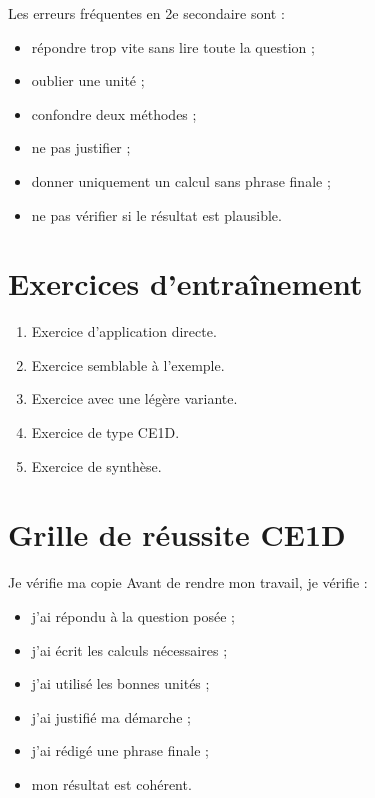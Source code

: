\documentclass[11pt,a4paper]{article}
\begin{document}
\begin{cadreattention}
Les erreurs fréquentes en 2e secondaire sont :
\begin{itemize}
    \item répondre trop vite sans lire toute la question ;
    \item oublier une unité ;
    \item confondre deux méthodes ;
    \item ne pas justifier ;
    \item donner uniquement un calcul sans phrase finale ;
    \item ne pas vérifier si le résultat est plausible.
\end{itemize}
\end{cadreattention}

\section{Exercices d’entraînement}

\begin{cadreactivite}
\begin{enumerate}
    \item Exercice d’application directe.
    \item Exercice semblable à l’exemple.
    \item Exercice avec une légère variante.
    \item Exercice de type CE1D.
    \item Exercice de synthèse.
\end{enumerate}
\end{cadreactivite}

\section{Grille de réussite CE1D}

\begin{cadregris}{Je vérifie ma copie}
Avant de rendre mon travail, je vérifie :
\begin{itemize}
    \item[$\square$] j’ai répondu à la question posée ;
    \item[$\square$] j’ai écrit les calculs nécessaires ;
    \item[$\square$] j’ai utilisé les bonnes unités ;
    \item[$\square$] j’ai justifié ma démarche ;
    \item[$\square$] j’ai rédigé une phrase finale ;
    \item[$\square$] mon résultat est cohérent.
\end{itemize}
\end{cadregris}
\end{document}
